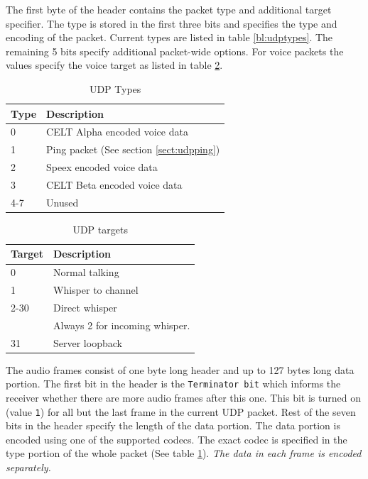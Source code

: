 \documentclass[11pt]{article} %
\begin{document}
The first byte of the header contains the packet type and additional target specifier. The type is stored in the first three bits and specifies the type and encoding of the packet. Current types are listed in table \ref{bl:udptypes}. The remaining 5 bits specify additional packet-wide options. For voice packets the values specify the voice target as listed in table \ref{tbl:udptargets}.

\begin{table}[htp]\begin{center}
	\caption{UDP Types}\label{tbl:udptypes}

	\begin{tabular}{ll}
		Type & Description \\
		\hline
		0	& CELT Alpha encoded voice data \\
		1	& Ping packet (See section \ref{sect:udpping}) \\
		2	& Speex encoded voice data \\
		3	& CELT Beta encoded voice data \\
		4-7 & Unused
	\end{tabular}
\end{center}\end{table}

\begin{table}[htp]\begin{center}
	\caption{UDP targets}\label{tbl:udptargets}

	\begin{tabular}{ll}
		Target & Description \\
		\hline
		0	& Normal talking \\
		1	& Whisper to channel \\
		2-30	& Direct whisper \\
			& Always 2 for incoming whisper. \\
		31	& Server loopback
	\end{tabular}
\end{center}\end{table}

The audio frames consist of one byte long header and up to 127 bytes long data portion. The first bit in the header is the \texttt{Terminator bit} which informs the receiver whether there are more audio frames after this one. This bit is turned on (value \texttt{1}) for all but the last frame in the current UDP packet. Rest of the seven bits in the header specify the length of the data portion. The data portion is encoded using one of the supported codecs. The exact codec is specified in the type portion of the whole packet (See table \ref{tbl:udptypes}). \emph{The data in each frame is encoded separately.}
\end{document}
